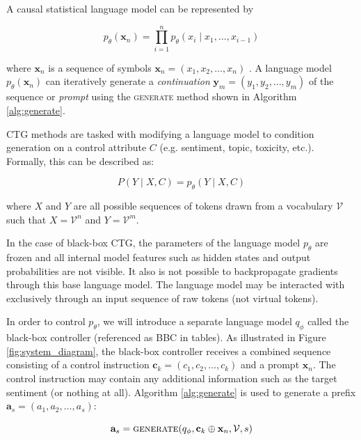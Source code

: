 \documentclass[phd,electronic,oneside,twosidetoc,letterpaper,chaptercenter,parttop,lof]{byumsphd}
\begin{document}
 A causal statistical language model can be represented by 

\begin{equation}
p_{\theta}(\mathbf{x}_n) = \prod_{i=1}^{n} p_{\theta}(x_i \mid x_1, \ldots, x_{i - 1})
\end{equation}

\noindent where \(\mathbf{x}_n\) is a sequence of symbols \(\mathbf{x}_n = (x_1, x_2, \ldots, x_n)\) \cite{bengio2000neural}.
A language model \(p_\theta(\mathbf{x}_n)\) can iteratively generate a \emph{continuation} \(\mathbf{y}_m = (y_1, y_2, \ldots, y_m)\) of the sequence or \emph{prompt} using the \textsc{generate} method shown in Algorithm \ref{alg:generate}.

CTG methods are tasked with modifying a language model to condition generation on a control attribute \(C\) (e.g. sentiment, topic, toxicity, etc.). Formally, this can be described as:

\begin{equation}
    P(Y \mid X, C) = p_\theta(Y \mid X, C)
\end{equation}

\noindent where \(X\) and \(Y\) are all possible sequences of tokens drawn from a vocabulary \(\mathcal{V}\) such that \(X = \mathcal{V}^{n}\) and \(Y = \mathcal{V}^m\).

In the case of black-box CTG, the parameters of the language model \(p_\theta\) are frozen and all internal model features such as hidden states and output probabilities are not visible. It also is not possible to backpropagate gradients through this base language model. The language model may be interacted with exclusively through an input sequence of raw tokens (not virtual tokens).


In order to control \(p_\theta\), we will introduce a separate language model \(q_\phi\) called the black-box controller (referenced as BBC in tables). As illustrated in Figure \ref{fig:system_diagram}, the black-box controller receives a combined sequence consisting of a control instruction \(\mathbf{c}_k = (c_1, c_2, \ldots, c_k)\) and a prompt \(\mathbf{x}_n\). The control instruction may contain any additional information such as the target sentiment (or nothing at all). Algorithm \ref{alg:generate} is used to generate a prefix \(\mathbf{a}_s = (a_1, a_2, \ldots, a_s)\):

\begin{equation}
    \mathbf{a}_s = \textrm{\textsc{generate}}(q_\phi, \mathbf{c}_k \oplus \mathbf{x}_n, \mathcal{V}, s)
\end{equation}
\end{document}
